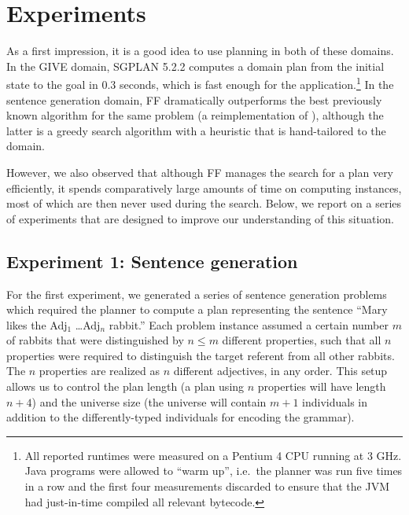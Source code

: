 \section{Experiments} \label{sec:experiments}

As a first impression, it is a good idea to use planning in both of
these domains.  In the GIVE domain, SGPLAN 5.2.2 computes a domain
plan from the initial state to the goal in 0.3 seconds, which is fast
enough for the application.\footnote{All reported runtimes were
  measured on a Pentium 4 CPU running at 3 GHz. Java programs were allowed
  to ``warm up'', i.e.\ the planner was run five times in a row and the
  first four measurements discarded to ensure that the JVM had just-in-time
  compiled all relevant bytecode.}  In the sentence
generation domain, FF dramatically outperforms the best previously known
algorithm for the same problem (a reimplementation of \cite{Stone2003a}),
although the latter is a greedy search algorithm with a heuristic that is
hand-tailored to the domain.

However, we also observed that although FF manages the search for a
plan very efficiently, it spends comparatively large amounts of time
on computing instances, most of which are then never used during the
search.  Below, we report on a series of experiments that are designed
to improve our understanding of this situation.

\subsection{Experiment 1: Sentence generation}
\label{sec:exper-1:-sent}

For the first experiment, we generated a series of sentence generation
problems which required the planner to compute a plan representing the
sentence ``Mary likes the Adj$_1$ \ldots Adj$_n$ rabbit.''  Each
problem instance assumed a certain number $m$ of rabbits that were
distinguished by $n \leq m$ different properties, such that all $n$
properties were required to distinguish the target referent from all
other rabbits.  The $n$ properties are realized as $n$ different
adjectives, in any order.  This setup allows us to control the plan
length (a plan using $n$ properties will have length $n+4$) and the
universe size (the universe will contain $m+1$ individuals in addition
to the differently-typed individuals for encoding the grammar).

